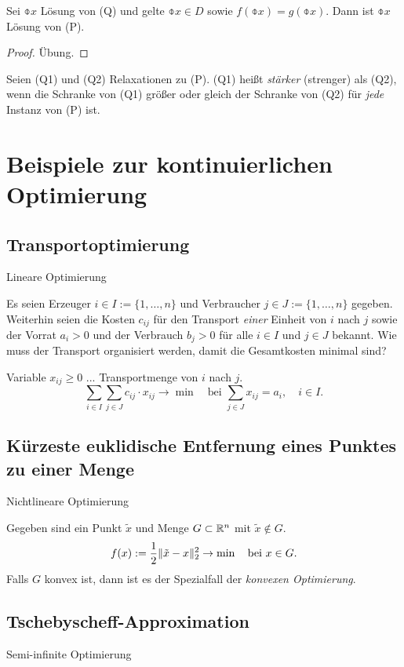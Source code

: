 \clearpage

\begin{thm}
  Sei $\obar{x}$ Lösung von (Q) und gelte $\obar{x} \in D$ sowie $f(\obar{x}) =
  g(\obar{x})$. Dann ist $\obar{x}$ Lösung von (P).
\end{thm}

\begin{proof}
  Übung.
\end{proof}

\begin{defn}
  Seien (Q1) und (Q2) Relaxationen zu (P). (Q1) heißt \emph{stärker} (strenger)
  als (Q2), wenn die Schranke von (Q1) größer oder gleich der Schranke von (Q2)
  für \emph{jede} Instanz von (P) ist.
\end{defn}

\section{Beispiele zur kontinuierlichen Optimierung}
\subsection{Transportoptimierung}
Lineare Optimierung

Es seien Erzeuger $i \in I := \{1, \ldots, n\}$ und Verbraucher $j \in J := \{1,
\ldots, n\}$ gegeben. Weiterhin seien die Kosten $c_{ij}$ für den Transport
\emph{einer} Einheit von $i$ nach $j$ sowie der Vorrat $a_i > 0$ und der
Verbrauch $b_j > 0$ für alle $i \in I$ und $j \in J$ bekannt. Wie muss der
Transport organisiert werden, damit die Gesamtkosten minimal sind?

Variable $x_{ij} \ge 0$ ... Transportmenge von $i$ nach $j$.
\[ \sum_{i \in I} \sum_{j \in J} c_{ij} \cdot x_{ij} \to \min \quad \text{bei }
  \sum_{j \in J} x_{ij} = a_i, \quad i \in I. \]

\subsection{Kürzeste euklidische Entfernung eines Punktes zu einer Menge}
Nichtlineare Optimierung

Gegeben sind ein Punkt $\tilde{x}$ und Menge $G \subset \mathbb{R}^n$ mit $\tilde{x}
\notin G$.
\[ f(x) := \frac{1}{2} \| \tilde{x} - x \|_2^2 \to \min \quad \text{bei } x \in
G. \]
Falls $G$ konvex ist, dann ist es der Spezialfall der \emph{konvexen
  Optimierung}.

\subsection{Tschebyscheff-Approximation}
Semi-infinite Optimierung


